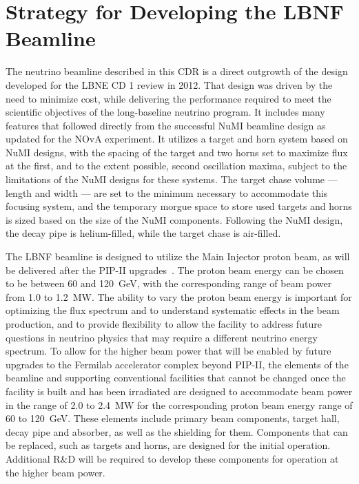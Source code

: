 \section{Strategy for Developing the LBNF Beamline}
 
The neutrino beamline described in this CDR is a direct outgrowth of the design~\cite{lbnecdr} developed for the LBNE
CD 1 review in 2012.  That design was driven by the need to minimize cost, while delivering the performance required to meet the scientific objectives of the long-baseline neutrino program.  It includes many features that followed directly from the 
successful NuMI beamline design as updated for the NOvA experiment.  It utilizes a target and horn system based on NuMI designs, with the spacing of the target and two horns set to maximize flux at the first, and to the extent possible, second 
oscillation maxima, subject to the limitations of  the NuMI designs for these systems.  The target chase volume --- length and width --- are set to the minimum necessary to accommodate this focusing system, and the temporary morgue space to store 
used targets and horns is sized based on the size of the NuMI components.  Following the NuMI design, the decay pipe is helium-filled, while the target chase is air-filled.  
 
The LBNF beamline is designed to utilize the Main Injector proton beam, as will be delivered after the PIP-II upgrades~\cite{pip2-2013}.  
The  proton beam energy can be chosen to be between 60 and 120~GeV, with the corresponding range of beam power from 1.0 to 1.2~MW.
The ability to vary the 
proton beam energy is important for optimizing the flux spectrum and to understand systematic effects in the beam production, and to provide flexibility to allow the facility to address future questions in neutrino physics that may require a 
different neutrino energy spectrum.  To allow for the higher beam power that will be enabled by future upgrades to the Fermilab accelerator complex beyond PIP-II, the elements of the beamline and supporting conventional facilities that cannot be changed once 
the facility is built and has been irradiated are designed to accommodate beam power in the range of 2.0 to 2.4~MW for the corresponding proton beam energy range of 60 to 120~GeV.  These elements include primary beam components, target hall, decay pipe and absorber, as 
well as the shielding for them.  Components that can be replaced, such as targets and horns, are designed for the  initial operation.  %
Additional R\&D
will be required to develop these components %
for operation at the higher beam power. 

